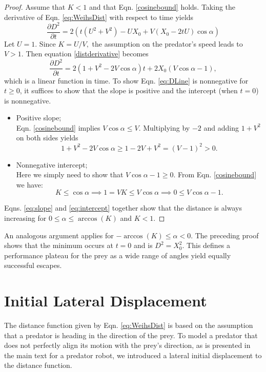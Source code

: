 \documentclass[12pt]{article}
\def\d{\partial}
\begin{document}
\begin{proof} Assume that $K<1$ and that Eqn. \ref{cosinebound} holds. 
Taking the derivative of Eqn. \ref{eq:WeihsDist} with respect to time yields
%
\begin{equation}
\frac{\d D^2}{\d t}  = 2(t(U^2+V^2) - UX_0 + V(X_0-2tU)\cos\alpha)
\label{distderivative}
\end{equation}  
%
Let $U=1$. Since $K = U/V,$ the assumption on the predator's speed leads to $V > 1.$ 
Then equation \eqref{distderivative} becomes
%
\begin{equation}
\frac{\d D^2}{\d t}  = 2(1+V^2-2V\cos\alpha)t + 2X_0(V\cos\alpha -1), 
\label{eq:DLine}
\end{equation}
%
which is a linear function in time. To show Eqn. \ref{eq:DLine} is nonnegative for $t\geq0$, it suffices to show that the slope is positive and the intercept (when $t=0$) is nonnegative. 
%
\begin{itemize}
\item Positive slope; \\
Eqn. \ref{cosinebound} implies $V\cos\alpha \leq V$. Multiplying by $-2$ and adding $1+V^2$ on both sides yields  
\begin{equation}
1+V^2 -2V \cos\alpha \geq 1 -2V + V^2 = (V-1)^2 > 0.
\label{eq:slope}
\end{equation}

\item Nonnegative intercept; \\
Here we simply need to show that $V\cos \alpha -1 \geq 0.$ From Eqn. \ref{cosinebound} we have:
\begin{equation}
K \leq \cos\alpha \implies 1 = VK \leq V\cos\alpha \implies 0 \leq V\cos \alpha - 1.
\label{eq:intercept}
\end{equation}  
\end{itemize}
%
Eqns. \ref{eq:slope} and  \ref{eq:intercept} together show that the distance is always increasing for $0\leq \alpha \leq \arccos (K)$ and $K<1.$ 
\end{proof}
An analogous argument applies for $-\arccos(K) \leq \alpha < 0.$ The preceding proof shows that the minimum occurs at $t=0$ and is $D^2 = X_0^2.$ This defines a performance plateau for the prey as a wide range of angles yield equally successful escapes. 



\section{Initial Lateral Displacement}
The distance function given by Eqn. \ref{eq:WeihsDist} is based on the assumption that a predator is heading in the direction of the prey. To model a predator that does not perfectly align its motion with the prey's direction, as is presented in the main text for a predator robot, we introduced a lateral initial displacement to the distance function. 
\end{document}
